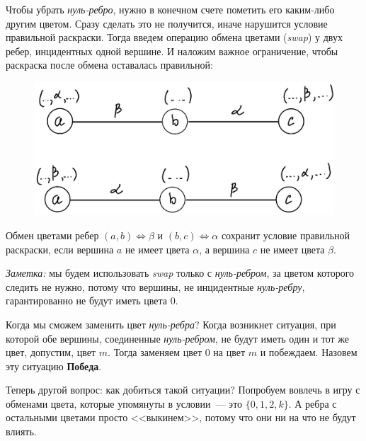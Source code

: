 Чтобы убрать \emph{нуль-ребро}, нужно в конечном счете пометить его каким-либо другим цветом. Сразу сделать это не получится, иначе нарушится условие правильной раскраски. Тогда введем операцию обмена цветами (\emph{swap}) у двух ребер, инцидентных одной вершине. И наложим важное ограничение, чтобы раскраска после обмена оставалась правильной:
\begin{figure}[H]
    \centering
    \includegraphics[scale=0.2]{Fall/img/solution-381_swap.jpg}
\end{figure}

Обмен цветами ребер \((a, b) \Leftrightarrow \beta\) и \((b, c) \Leftrightarrow \alpha\) сохранит условие правильной раскраски, если вершина \(a\) не имеет цвета \(\alpha\), а вершина \(c\) не имеет цвета \(\beta\).

\emph{Заметка:} мы будем использовать \emph{swap} только с \emph{нуль-ребром}, за цветом которого следить не нужно, потому что вершины, не инцидентные \emph{нуль-ребру}, гарантированно не будут иметь цвета \(0\).

Когда мы сможем заменить цвет \emph{нуль-ребра}? Когда возникнет ситуация, при которой обе вершины, соединенные \emph{нуль-ребром}, не будут иметь один и тот же цвет, допустим, цвет \(m\). Тогда заменяем цвет \(0\) на цвет \(m\) и побеждаем. Назовем эту ситуацию \textbf{Победа}.

Теперь другой вопрос: как добиться такой ситуации? Попробуем вовлечь в игру с обменами цвета, которые упомянуты в условии~--- это \(\{0, 1, 2, k\}\). А ребра с остальными цветами просто <<выкинем>>, потому что они ни на что не будут влиять.

